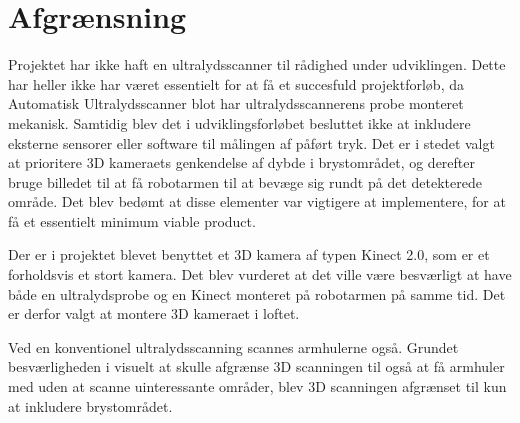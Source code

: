 \chapter{Afgrænsning}
\label{Afgransning}

Projektet har ikke haft en ultralydsscanner til rådighed under udviklingen. Dette har heller ikke har været essentielt for at få et succesfuld projektforløb, da  Automatisk Ultralydsscanner blot har ultralydsscannerens probe monteret mekanisk. Samtidig blev det i udviklingsforløbet besluttet ikke at inkludere eksterne sensorer eller software til målingen af påført tryk. Det er i stedet valgt at prioritere 3D kameraets genkendelse af dybde i brystområdet, og derefter bruge billedet til at få robotarmen til at bevæge sig rundt på det detekterede område. Det blev bedømt at disse elementer var vigtigere at implementere, for at få et essentielt minimum viable product.

Der er i projektet blevet benyttet et 3D kamera af typen Kinect 2.0, som er et forholdsvis et stort kamera. Det blev vurderet at det ville være besværligt at have både en ultralydsprobe og en Kinect monteret på robotarmen på samme tid. Det er derfor valgt at montere 3D kameraet i loftet. 

Ved en konventionel ultralydsscanning scannes armhulerne også. Grundet besværligheden i visuelt at skulle afgrænse 3D scanningen til også at få armhuler med uden at scanne uinteressante områder, blev 3D scanningen afgrænset til kun at inkludere brystområdet.